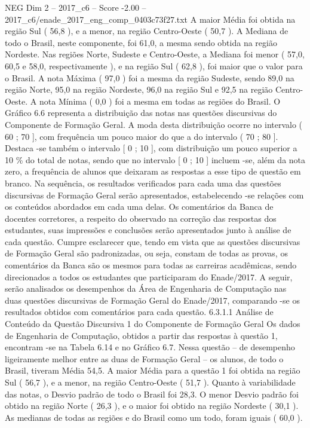 \begin{textsample}{NEG Dim 2 – 2017\_c6 – Score -2.00 – 2017\_c6/enade\_2017\_eng\_comp\_0403c73f27.txt}
A maior Média foi obtida na região Sul ( 56,8 ), e a menor, na região Centro-Oeste ( 50,7 ).
A Mediana de todo o Brasil, neste componente, foi 61,0, a mesma sendo obtida na região Nordeste.
Nas regiões Norte, Sudeste e Centro-Oeste, a Mediana foi menor ( 57,0, 60,5 e 58,0, respectivamente ), e na região Sul ( 62,8 ), foi maior que o valor para o Brasil.
A nota Máxima ( 97,0 ) foi a mesma da região Sudeste, sendo 89,0 na região Norte, 95,0 na região Nordeste, 96,0 na região Sul e 92,5 na região Centro-Oeste.
A nota Mínima ( 0,0 ) foi a mesma em todas as regiões do Brasil.
O Gráfico 6.6 representa a distribuição das notas nas questões discursivas do Componente de Formação Geral.
A moda desta distribuição ocorre no intervalo ( 60 ; 70 ], com frequência um pouco maior do que a do intervalo ( 70 ; 80 ].
Destaca -se também o intervalo [ 0 ; 10 ], com distribuição um pouco superior a 10 \% do total de notas, sendo que no intervalo [ 0 ; 10 ] incluem -se, além da nota zero, a frequência de alunos que deixaram as respostas a esse tipo de questão em branco.
Na sequência, os resultados verificados para cada uma das questões discursivas de Formação Geral serão apresentados, estabelecendo -se relações com os conteúdos abordados em cada uma delas.
Os comentários da Banca de docentes corretores, a respeito do observado na correção das respostas dos estudantes, suas impressões e conclusões serão apresentados junto à análise de cada questão.
Cumpre esclarecer que, tendo em vista que as questões discursivas de Formação Geral são padronizadas, ou seja, constam de todas as provas, os comentários da Banca são os mesmos para todas as carreiras acadêmicas, sendo direcionados a todos os estudantes que participaram do Enade/2017.
A seguir, serão analisados os desempenhos da Área de Engenharia de Computação nas duas questões discursivas de Formação Geral do Enade/2017, comparando -se os resultados obtidos com comentários para cada questão. 6.3.1.1 Análise de Conteúdo da Questão Discursiva 1 do Componente de Formação Geral Os dados de Engenharia de Computação, obtidos a partir das respostas à questão 1, encontram -se na Tabela 6.14 e no Gráfico 6.7.
Nessa questão – de desempenho ligeiramente melhor entre as duas de Formação Geral – os alunos, de todo o Brasil, tiveram Média 54,5.
A maior Média para a questão 1 foi obtida na região Sul ( 56,7 ), e a menor, na região Centro-Oeste ( 51,7 ).
Quanto à variabilidade das notas, o Desvio padrão de todo o Brasil foi 28,3.
O menor Desvio padrão foi obtido na região Norte ( 26,3 ), e o maior foi obtido na região Nordeste ( 30,1 ).
As medianas de todas as regiões e do Brasil como um todo, foram iguais ( 60,0 ).

\end{textsample}
